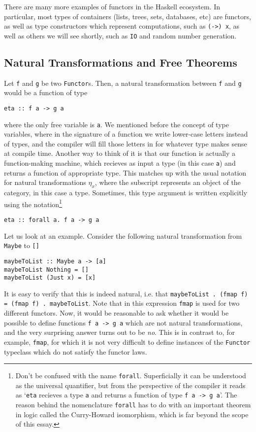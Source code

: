 \documentclass[11pt]{article}
\theoremstyle{nonumberplain}
\newcommand*\lsin{\lstinline}
\begin{document}
There are many more examples of functors in the Haskell ecosystem. In particular, most types of containers (lists, trees, sets, databases, etc) are functors, as well as type constructors which represent computations, such as \lsin|(->) x|, as well as others we will see shortly, such as \lsin|IO| and random number generation.

\subsection{Natural Transformations and Free Theorems}

Let \lsin|f| and \lsin|g| be two \lsin|Functor|s. Then, a natural transformation between \lsin|f| and \lsin|g| would be a function of type
\begin{lstlisting}
eta :: f a -> g a
\end{lstlisting}
where the only free variable is \lsin|a|. We mentioned before the concept of type variables, where in the signature of a function we write lower-case letters instead of types, and the compiler will fill those letters in for whatever type makes sense at compile time. Another way to think of it is that our function is actually a function-making machine, which recieves as input a type (in this case \lsin|a|) and returns a function of appropriate type. This matches up with the usual notation for natural transformations $\eta_x$, where the subscript represents an object of the category, in this case a type. Sometimes, this type argument is written explicitly using the notation\footnote{Don't be confused with the name \lsin|forall|. Superficially it can be understood as the universal quantifier, but from the perspective of the compiler it reads as `\lsin|eta| recieves a type \lsin|a| and returns a function of type \lsin|f a -> g a|'. The reason behind the nomenclature \lsin|forall| has to do with an important theorem in logic called the Curry-Howard isomorphism, which is far beyond the scope of this essay.}
\begin{lstlisting}
eta :: forall a. f a -> g a
\end{lstlisting}

Let us look at an example. Consider the following natural transformation from \lsin|Maybe| to \lsin|[]|
\begin{lstlisting}
maybeToList :: Maybe a -> [a]
maybeToList Nothing = []
maybeToList (Just x) = [x]
\end{lstlisting}

It is easy to verify that this is indeed natural, i.e. that \lsin|maybeToList . (fmap f) = (fmap f) . maybeToList|. Note that in this expression \lsin|fmap| is used for two different functors. Now, it would be reasonable to ask whether it would be possible to define functions \lsin|f a -> g a| which are not natural transformations, and the very surprising answer turns out to be \emph{no}. This is in contrast to, for example, \lsin|fmap|, for which it is not very difficult to define instances of the \lsin|Functor| typeclass which do not satisfy the functor laws.
\end{document}

